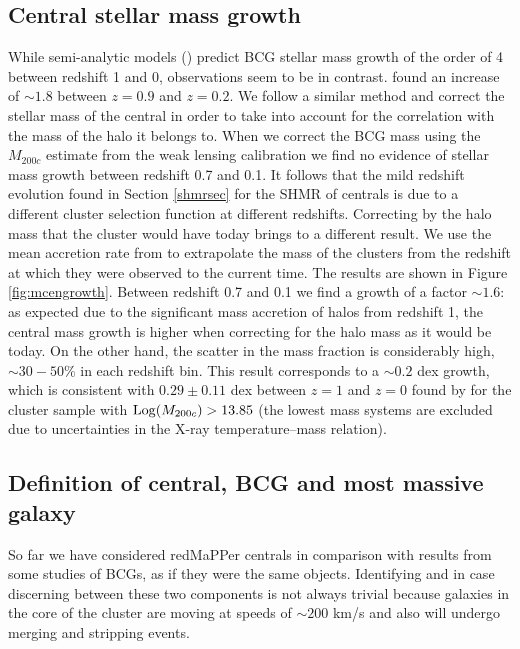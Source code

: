 {\subsection{Central stellar mass growth}\label{sec:cengrowth}

While semi-analytic models (\citealt{delucia}) predict BCG stellar mass growth of the order of 4 between redshift 1 and 0, observations seem to be in contrast. \citet{lidman} found an increase of $\sim 1.8$ between $z=0.9$ and $z=0.2$. We follow a similar method and correct the stellar mass of the central in order to take into account for the correlation with the mass of the halo it belongs to. %
When we correct the BCG mass using the $M_{200c}$ estimate from the weak lensing calibration we find no evidence of stellar mass growth between redshift 0.7 and 0.1. It follows that the mild redshift evolution found in Section \ref{shmrsec} for the SHMR of centrals is due to a different cluster selection function at different redshifts. Correcting by the halo mass that the cluster would have today brings to a different result. We use the mean accretion rate from \citet{accretion} to extrapolate the mass of the clusters from the redshift at which they were observed to the current time. The results are shown in Figure \ref{fig:mcengrowth}. Between redshift 0.7 and 0.1 we find a growth of a factor $\sim 1.6$: as expected due to the significant mass accretion of halos from redshift 1, the central mass growth is higher when correcting for the halo mass as it would be today. On the other hand, the scatter in the mass fraction is considerably high, $\sim 30-50\%$ in each redshift bin. This result corresponds to a $\sim 0.2$ dex growth, which is consistent with $0.29\pm0.11$ dex between $z=1$ and $z=0$ found by \citet{zhangbcg} for the cluster sample with ${\rm Log}(M_{200c}) >13.85$ (the lowest mass systems are excluded due to uncertainties in the X-ray temperature--mass relation).

\subsection{Definition of central, BCG and most massive galaxy}

So far we have considered redMaPPer centrals in comparison with results from some studies of BCGs, as if they were the same objects. Identifying and in case discerning between these two components is not always trivial because galaxies in the core of the cluster are moving at speeds of $\sim 200$ km/s and also will undergo  merging and stripping events. 

}
